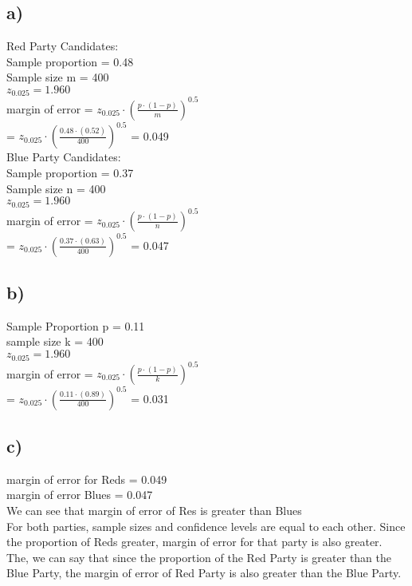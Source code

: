 \documentclass[12pt]{article}
\begin{document}
\subsection*{a)}
Red Party Candidates: \\
Sample proportion = 0.48\\
Sample size m = 400\\
$z_{0.025} = 1.960$ \\
margin of error = $z_{0.025}\cdot(\frac{p\cdot(1-p)}{m})^{0.5}$\\
= $z_{0.025}\cdot(\frac{0.48\cdot(0.52)}{400})^{0.5}$ = 0.049\\

Blue Party Candidates: \\
Sample proportion = 0.37\\
Sample size n = 400\\
$z_{0.025} = 1.960$ \\
margin of error = $z_{0.025}\cdot(\frac{p\cdot(1-p)}{n})^{0.5}$\\
= $z_{0.025}\cdot(\frac{0.37\cdot(0.63)}{400})^{0.5}$ = 0.047\\

\subsection*{b)}
Sample Proportion p = 0.11\\
sample size k = 400\\
$z_{0.025} = 1.960$ \\
margin of error = $z_{0.025}\cdot(\frac{p\cdot(1-p)}{k})^{0.5}$\\
= $z_{0.025}\cdot(\frac{0.11\cdot(0.89)}{400})^{0.5}$ = 0.031\\

\subsection*{c)}
margin of error for Reds = 0.049\\
margin of error Blues = 0.047\\
We can see that margin of error of Res is greater than Blues\\
For both parties, sample sizes and confidence levels are equal to each other. Since the proportion of Reds greater, margin of error for that party is also greater.\\
The, we can say that since the proportion of the Red Party is greater than the Blue Party, the margin of error of Red Party is also greater than the Blue Party.\\
\end{document}
